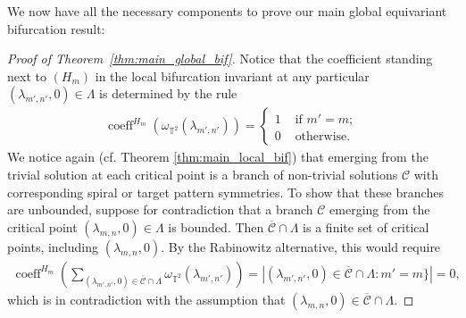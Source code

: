\documentclass[11pt]{amsart}
\def\bt{{\mathbb{T}}}
\begin{document}
We now have all the necessary components to prove our main global equivariant bifurcation result:
\begin{proof}[Proof of Theorem~\ref{thm:main_global_bif}]
Notice that the coefficient standing next to $(H_m)$ in the local bifurcation invariant at any particular $(\lambda_{m',n'},0) \in \Lambda$ is determined by the rule
\begin{align*}
\operatorname{coeff}^{H_m}\left(\omega_{\bt^2}(\lambda_{m',n'})\right)=    \begin{cases}
        1 & \text{ if } m' = m; \\
        0 & \text{ otherwise}.
    \end{cases}
\end{align*}
We notice again (cf. Theorem \ref{thm:main_local_bif}) that emerging from the trivial solution at each critical point is a branch of non-trivial solutions $\mathcal C$ with corresponding spiral or target pattern symmetries. To show that these branches are unbounded, suppose for contradiction that a branch $\mathcal{C}$ emerging from the critical point $(\lambda_{m,n},0) \in \Lambda$ is bounded. Then $\overline{\mathcal{C}} \cap \Lambda$ is a finite set of critical points, including $(\lambda_{m,n},0)$. By the Rabinowitz alternative, this would require
 \begin{align*} \operatorname{coeff}^{H_m}\left( \sum_{(\lambda_{m',n'},0)\in \overline{\mathcal C} \cap \Lambda} \omega_{\bt^2}(\lambda_{m',n'}) \right) = | (\lambda_{m',n'},0) \in \overline{\mathcal C} \cap \Lambda : m' = m \}| =0, \end{align*}
    which is in contradiction with the assumption that $(\lambda_{m,n},0) \in \overline{\mathcal C} \cap \Lambda$.
\end{proof}

\newpage
\appendix
\end{document}
